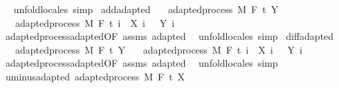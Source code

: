 \begin{isabellebody}
\isadelimproof
\ %
\endisadelimproof
%
\isatagproof
{}\isamarkupfalse%
\ {\isacharparenleft}{\kern0pt}unfold{\isacharunderscore}{\kern0pt}locales{\isacharparenright}{\kern0pt}\ simp%
\endisatagproof
{\isafoldproof}%
%
\isadelimproof
%
\endisadelimproof
\isanewline
\isanewline
{}\isamarkupfalse%
\ add{\isacharunderscore}{\kern0pt}adapted{\isacharcolon}{\kern0pt}\isanewline
\ \ \ {\isachardoublequoteopen}adapted{\isacharunderscore}{\kern0pt}process\ M\ F\ t\ Y{\isachardoublequoteclose}\isanewline
\ \ \ {\isachardoublequoteopen}adapted{\isacharunderscore}{\kern0pt}process\ M\ F\ t\ {\isacharparenleft}{\kern0pt}{\isasymlambda}i\ {\isasymxi}{\isachardot}{\kern0pt}\ X\ i\ {\isasymxi}\ {\isacharplus}{\kern0pt}\ Y\ i\ {\isasymxi}{\isacharparenright}{\kern0pt}{\isachardoublequoteclose}\isanewline
%
\isadelimproof
\ \ %
\endisadelimproof
%
\isatagproof
{}\isamarkupfalse%
\ adapted{\isacharunderscore}{\kern0pt}process{\isachardot}{\kern0pt}adapted{\isacharbrackleft}{\kern0pt}OF\ assms{\isacharbrackright}{\kern0pt}\ adapted\ \isamarkupfalse%
\ {\isacharparenleft}{\kern0pt}unfold{\isacharunderscore}{\kern0pt}locales{\isacharparenright}{\kern0pt}\ simp%
\endisatagproof
{\isafoldproof}%
%
\isadelimproof
\isanewline
%
\endisadelimproof
\isanewline
{}\isamarkupfalse%
\ diff{\isacharunderscore}{\kern0pt}adapted{\isacharcolon}{\kern0pt}\isanewline
\ \ \ {\isachardoublequoteopen}adapted{\isacharunderscore}{\kern0pt}process\ M\ F\ t\ Y{\isachardoublequoteclose}\isanewline
\ \ \ {\isachardoublequoteopen}adapted{\isacharunderscore}{\kern0pt}process\ M\ F\ t\ {\isacharparenleft}{\kern0pt}{\isasymlambda}i\ {\isasymxi}{\isachardot}{\kern0pt}\ X\ i\ {\isasymxi}\ {\isacharminus}{\kern0pt}\ Y\ i\ {\isasymxi}{\isacharparenright}{\kern0pt}{\isachardoublequoteclose}\isanewline
%
\isadelimproof
\ \ %
\endisadelimproof
%
\isatagproof
{}\isamarkupfalse%
\ adapted{\isacharunderscore}{\kern0pt}process{\isachardot}{\kern0pt}adapted{\isacharbrackleft}{\kern0pt}OF\ assms{\isacharbrackright}{\kern0pt}\ adapted\ \isamarkupfalse%
\ {\isacharparenleft}{\kern0pt}unfold{\isacharunderscore}{\kern0pt}locales{\isacharparenright}{\kern0pt}\ simp%
\endisatagproof
{\isafoldproof}%
%
\isadelimproof
\isanewline
%
\endisadelimproof
\isanewline
{}\isamarkupfalse%
\ uminus{\isacharunderscore}{\kern0pt}adapted{\isacharcolon}{\kern0pt}\ {\isachardoublequoteopen}adapted{\isacharunderscore}{\kern0pt}process\ M\ F\ t\ {\isacharparenleft}{\kern0pt}{\isacharminus}{\kern0pt}X{\isacharparenright}{\kern0pt}{\isachardoublequoteclose}%

\end{isabellebody}
